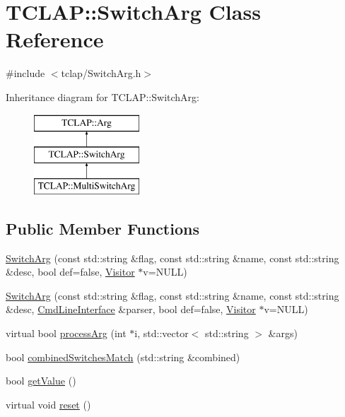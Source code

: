\hypertarget{class_t_c_l_a_p_1_1_switch_arg}{}\section{T\+C\+L\+A\+P\+:\+:Switch\+Arg Class Reference}
\label{class_t_c_l_a_p_1_1_switch_arg}


{\ttfamily \#include $<$tclap/\+Switch\+Arg.\+h$>$}

Inheritance diagram for T\+C\+L\+A\+P\+:\+:Switch\+Arg\+:\begin{figure}[H]
\begin{center}
\leavevmode
\includegraphics[height=3.000000cm]{class_t_c_l_a_p_1_1_switch_arg}
\end{center}
\end{figure}
\subsection*{Public Member Functions}
\begin{DoxyCompactItemize}
\item 
\hyperlink{class_t_c_l_a_p_1_1_switch_arg_a3895b036fa2d36e4fcfa41dfcdb298c1}{Switch\+Arg} (const std\+::string \&flag, const std\+::string \&name, const std\+::string \&desc, bool def=false, \hyperlink{class_t_c_l_a_p_1_1_visitor}{Visitor} $\ast$v=N\+U\+L\+L)
\item 
\hyperlink{class_t_c_l_a_p_1_1_switch_arg_af7e9628155772af0686f6a2114dfe78b}{Switch\+Arg} (const std\+::string \&flag, const std\+::string \&name, const std\+::string \&desc, \hyperlink{class_t_c_l_a_p_1_1_cmd_line_interface}{Cmd\+Line\+Interface} \&parser, bool def=false, \hyperlink{class_t_c_l_a_p_1_1_visitor}{Visitor} $\ast$v=N\+U\+L\+L)
\item 
virtual bool \hyperlink{class_t_c_l_a_p_1_1_switch_arg_a624f98df6c4907efec95ffc353e9d08c}{process\+Arg} (int $\ast$i, std\+::vector$<$ std\+::string $>$ \&args)
\item 
bool \hyperlink{class_t_c_l_a_p_1_1_switch_arg_af5fbd44d462539941b09e960034d692c}{combined\+Switches\+Match} (std\+::string \&combined)
\item 
bool \hyperlink{class_t_c_l_a_p_1_1_switch_arg_aed1bc8a81a9bda4013cfcf407ccc7716}{get\+Value} ()
\item 
virtual void \hyperlink{class_t_c_l_a_p_1_1_switch_arg_af8561d903ec3c11f5f2175e6db179d9c}{reset} ()
\end{DoxyCompactItemize}

